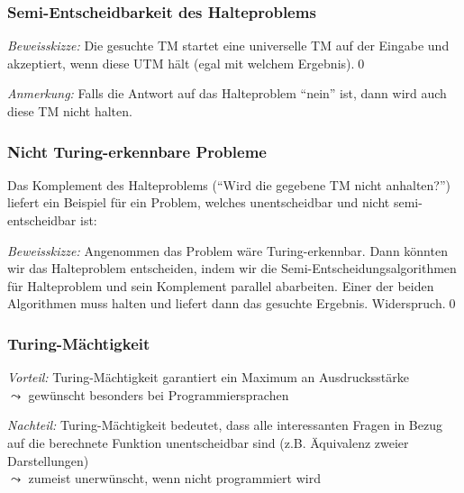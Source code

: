 \documentclass[aspectratio=1610,onlymath]{beamer}
\begin{document}
\begin{frame}\frametitle{Semi-Entscheidbarkeit des Halteproblems}


\emph{Beweisskizze:} Die gesuchte TM startet eine universelle TM auf der Eingabe 
und akzeptiert, wenn diese UTM hält (egal mit welchem Ergebnis).\qed

\bigskip
\emph{Anmerkung:} Falls die Antwort auf das Halteproblem "`nein"' ist, dann wird auch diese
TM nicht halten.

\end{frame}

\begin{frame}\frametitle{Nicht Turing-erkennbare Probleme}

Das Komplement des Halteproblems ("`Wird die gegebene TM nicht anhalten?"') liefert 
ein Beispiel für ein Problem, welches unentscheidbar und nicht semi-entscheidbar ist:
\medskip


\emph{Beweisskizze:} Angenommen das Problem wäre Turing-erkennbar.
Dann könnten wir
das Halteproblem entscheiden, indem wir die Semi-Entscheidungsalgorithmen für Halteproblem
und sein Komplement parallel abarbeiten. Einer der beiden Algorithmen muss halten und liefert
dann das gesuchte Ergebnis. Widerspruch.\qed

\end{frame}

\begin{frame}\frametitle{Turing-Mächtigkeit}

\bigskip

\emph{Vorteil:} Turing-Mächtigkeit garantiert ein Maximum an Ausdrucksstärke\\
$\leadsto$ gewünscht besonders bei Programmiersprachen
\bigskip

\emph{Nachteil:} Turing-Mächtigkeit bedeutet, dass alle interessanten Fragen in Bezug auf die berechnete Funktion unentscheidbar sind (z.B. Äquivalenz zweier Darstellungen) \\
$\leadsto$ zumeist unerwünscht, wenn nicht programmiert wird

\end{frame}
\end{document}
